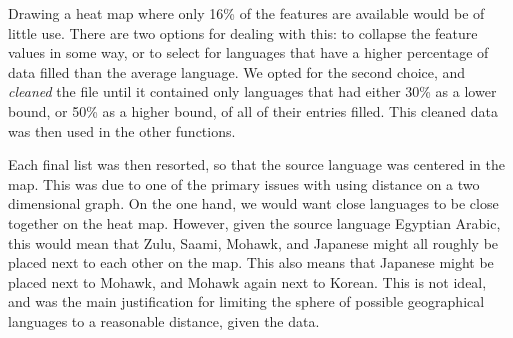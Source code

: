 \documentclass[11pt]{article}
\begin{document}
Drawing a heat map where only 16\% of the features are available would be of little use. There are two options for dealing with this: to collapse the feature values in some way, or to select for languages that have a higher percentage of data filled than the average language. We opted for the second choice, and \emph{cleaned}  the file until it contained only languages that had either 30\% as a lower bound, or 50\% as a higher bound, of all of their entries filled. This cleaned data was then used in the other functions.  

	




Each final list was then resorted, so that the source language was centered in the map. This was due to one of the primary issues with using distance on a two dimensional graph. On the one hand, we would want close languages to be close together on the heat map. However, given the source language Egyptian Arabic, this would mean that Zulu, Saami, Mohawk, and Japanese might all roughly be placed next to each other on the map. This also means that Japanese might be placed next to Mohawk, and Mohawk again next to Korean. This is not ideal, and was the main justification for limiting the sphere of possible geographical languages to a reasonable distance, given the data. 




\end{document}
